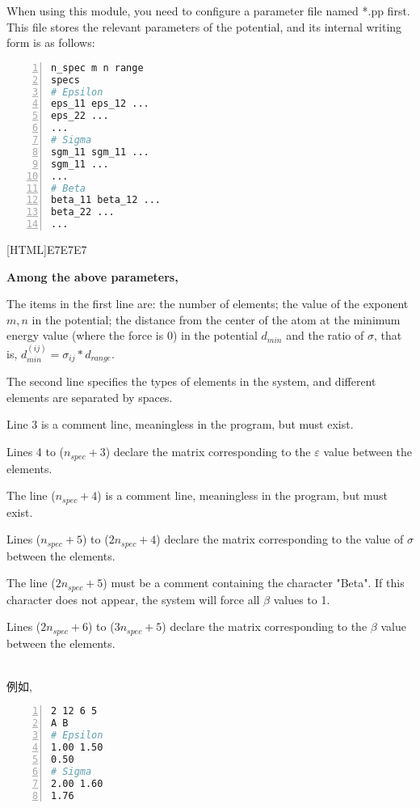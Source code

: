\documentclass[a4paper, 10pt]{article}
\begin{document}
When using this module, you need to configure a parameter file named *.pp first. This file stores the relevant parameters of the potential, and its internal writing form is as follows:
\begin{lstlisting}[language={bash},numbers=left]
n_spec m n range
specs
# Epsilon
eps_11 eps_12 ...
eps_22 ...
...
# Sigma
sgm_11 sgm_11 ... 
sgm_11 ... 
...
# Beta
beta_11 beta_12 ...
beta_22 ...
...
\end{lstlisting}

\noindent{}[HTML]{E7E7E7}{\parbox{\textwidth}{%
\noindent \textbf{Among the above parameters,}
\begin{maineu}
  \item The items in the first line are: the number of elements; the value of the exponent \(m,n\) in the potential; the distance from the center of the atom at the minimum energy value (where the force is 0) in the potential \(d_{min}\) and the ratio of \(\sigma\), that is, \(d_{min}^{(ij)} = \sigma_{ij}*d_{range}\).
  \item The second line specifies the types of elements in the system, and different elements are separated by spaces.
  \item Line 3 is a comment line, meaningless in the program, but must exist.
  \item Lines 4 to (\(n_{spec}+3\)) declare the matrix corresponding to the \(\varepsilon\) value between the elements.
  \item The line (\(n_{spec}+4\)) is a comment line, meaningless in the program, but must exist.
  \item Lines (\(n_{spec}+5\)) to (\(2n_{spec}+4\)) declare the matrix corresponding to the value of \(\sigma\) between the elements.
  \item The line (\(2n_{spec}+5\)) must be a comment containing the character "Beta". If this character does not appear, the system will force all \(\beta\) values to 1.
  \item Lines (\(2n_{spec}+6\)) to (\(3n_{spec}+5\)) declare the matrix corresponding to the \(\beta\) value between the elements.
\end{maineu}}}\\

例如,
\begin{lstlisting}[language={bash},numbers=left]
2 12 6 5
A B
# Epsilon
1.00 1.50
0.50
# Sigma
2.00 1.60
1.76
\end{lstlisting}
\end{document}
